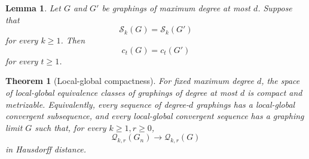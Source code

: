 \documentclass[10pt,a4paper]{amsart}
\newtheorem{theorem}{Theorem}
\newtheorem{lemma}{Lemma}
\newcommand{\calQ}{\mathcal Q}
\newcommand{\calS}{\mathcal S}
\begin{document}
\begin{lemma}\label{lem:closed-walks-equal}
Let $G$ and $G'$ be graphings of maximum degree at most $d$.  Suppose that
\[
 \calS_k(G)=\calS_k(G')
\]
for every $k\geq 1$.  Then
\[
 c_t(G)=c_t(G')
\]
for every $t\geq 1$.
\end{lemma}

\begin{theorem}[Local-global compactness]\label{thm:HLS}
For fixed maximum degree $d$, the space of local-global equivalence classes of graphings of degree at most $d$ is compact and metrizable.  Equivalently, every sequence of degree-$d$ graphings has a local-global convergent subsequence, and every local-global convergent sequence has a graphing limit $G$ such that, for every $k\geq 1,r\geq 0$,
\[
 \calQ_{k,r}(G_n) \longrightarrow \calQ_{k,r}(G)
\]
in Hausdorff distance.
\end{theorem}
\end{document}
